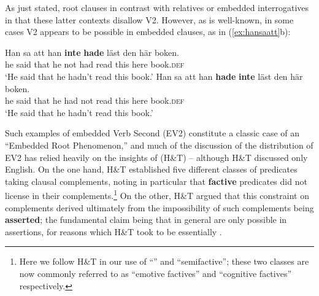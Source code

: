 \documentclass[output=paper]{langsci/langscibook}
\begin{document}
As just stated, root clauses in  contrast with relatives or embedded interrogatives in that these latter contexts disallow V2. However, as is well-known, in some cases V2 appears to be possible in embedded clauses, as in (\ref{ex:hansaatt}b):

\ea\label{ex:hansaatt}	
	\ea 
    \gll Han sa att han \textbf{inte} \textbf{hade} l{\"a}st den h{\"a}r  boken. \\
			he said that he not had read this here book.\textsc{def}\\
	 \glt `He said that he hadn't read this book.' 
	\ex 
    \gll Han sa att han \textbf{hade} \textbf{inte}  l{\"a}st den h{\"a}r  boken. \\
			he said that he  had not read this here book.\textsc{def}\\
         \glt `He said that he hadn't read this book.'         \z   
	\z

Such examples of embedded Verb Second (EV2) constitute a classic case of an ``Embedded Root Phenomenon,'' and much of the discussion of the distribution of EV2 has relied heavily on the insights of \cite{HooperThompson1973} (H\&T) -- although H\&T discussed only English.  On the one hand, H\&T established five different classes of predicates taking clausal complements, noting in particular that \textbf{factive} predicates did not license  in their complements.\footnote{Here we follow H\&T in our use of “” and “semifactive”; these two classes are now commonly referred to as “emotive factives” and “cognitive factives” respectively.} On the other, H\&T argued that this constraint on  complements derived ultimately from the impossibility of such complements being \textbf{asserted}; the fundamental claim being that  in general are only possible in assertions, for reasons which H\&T took to be essentially .  
\end{document}
